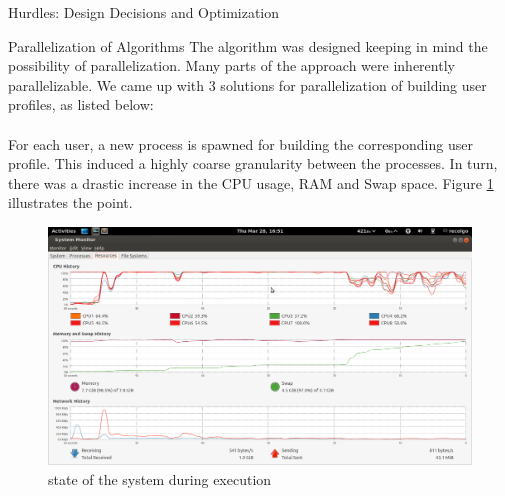\documentclass{report}
\begin{document}
\begin{projChapter}{Hurdles: Design Decisions and Optimization}
\begin{projSection}{Parallelization of Algorithms}
            The algorithm was designed keeping in mind the possibility of parallelization. Many parts of the approach were inherently parallelizable. We came up with 3 solutions for parallelization of building user profiles, as listed below:
            ~\\\\
            For each user, a new process is spawned for building the corresponding user profile. This induced a highly coarse granularity between the processes. In turn, there was a drastic increase in the CPU usage, RAM and Swap space. Figure \ref{sysmon} illustrates the point.
            \begin{figure}[ht!]
\centering
\includegraphics[scale=0.35]{images/sysmon.png}
\caption{state of the system during execution}
\label{sysmon}
\end{figure}


\end{projSection}
\end{projChapter}
\end{document}
